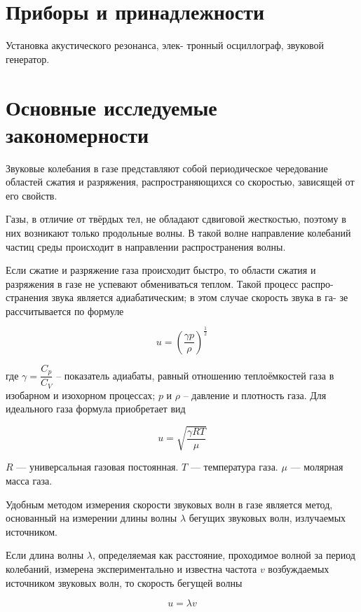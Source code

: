 \documentclass[12pt,a4paper]{article}%
\begin{document}
\section*{Приборы и принадлежности}

Установка акустического резонанса, элек-
тронный осциллограф, звуковой генератор.

\section*{Основные исследуемые закономерности}

Звуковые колебания в газе представляют собой периодическое чередование областей сжатия и разряжения, распространяющихся со скоростью, зависящей от его свойств.

Газы, в отличие от твёрдых тел, не обладают сдвиговой жесткостью, поэтому в них возникают только продольные волны. В такой волне направление колебаний частиц среды происходит в направлении
распространения волны.

Если сжатие и разряжение газа происходит быстро, то области сжатия и
разряжения в газе не успевают обмениваться теплом. Такой процесс распро-
странения звука является адиабатическим; в этом случае скорость звука в га-
зе рассчитывается по формуле

\begin{equation}
	u = (\dfrac{\gamma p}{\rho})^{\dfrac{_1}{^2}}
\end{equation}

где $ \gamma = \dfrac{C_p}{C_V}$ – показатель адиабаты, равный отношению теплоёмкостей газа
в изобарном и изохорном процессах; $p$ и $\rho$ – давление и плотность газа. Для идеального газа формула приобретает вид

\begin{equation}
	u = \sqrt{\dfrac{\gamma RT}{\mu}}
\end{equation}

$R$ --- универсальная газовая постоянная. $T$ --- температура газа. $\mu$ --- молярная масса газа.

Удобным методом измерения скорости звуковых волн в газе является
метод, основанный на измерении длины волны $\lambda$ бегущих звуковых волн, излучаемых источником. 

Если длина волны $\lambda$, определяемая как расстояние,
проходимое волной за период колебаний, измерена экспериментально и известна частота $v$ возбуждаемых источником звуковых волн, то скорость бегущей волны

\begin{equation}
u = \lambda v
\end{equation}
\end{document}
